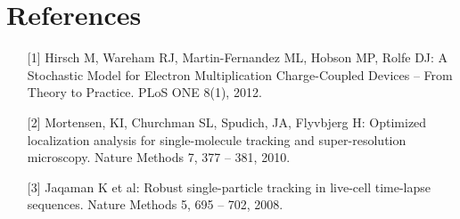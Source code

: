 \documentclass[11pt,onside]{report}
\numberwithin{equation}{chapter}
\begin{document}
\section{References}
\begin{itemize}
\item [{[1]}]  Hirsch M, Wareham RJ, Martin-Fernandez ML, Hobson MP, Rolfe DJ: A Stochastic Model for Electron Multiplication Charge-Coupled Devices {--} From Theory to Practice. PLoS ONE 8(1), 2012.
\item [{[2]}] Mortensen, KI, Churchman SL, Spudich, JA, Flyvbjerg H: Optimized localization analysis for single-molecule tracking and super-resolution microscopy. Nature Methods 7, 377 {--} 381, 2010.
\item [{[3]}] Jaqaman K et al: Robust single-particle tracking in live-cell time-lapse sequences. Nature Methods 5, 695 {--} 702, 2008.

\end{itemize}
\end{document}
